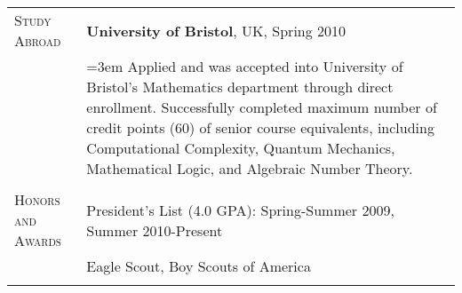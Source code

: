 \begin{tabular}{l p{340pt}}

\textsc{Study Abroad} & \textbf{University of Bristol}, UK, Spring 2010\\
& \hangindent=3em \hangafter=0  Applied and was accepted into University of Bristol's Mathematics department through direct enrollment.  Successfully completed maximum number of credit points (60) of senior course equivalents, including Computational Complexity, Quantum Mechanics, Mathematical Logic, and Algebraic Number Theory.\\
& \\

\textsc{Honors and Awards} & President's List (4.0 GPA): Spring-Summer 2009, Summer 2010-Present\\
& Eagle Scout, Boy Scouts of America\\
& \\


\end{tabular}
